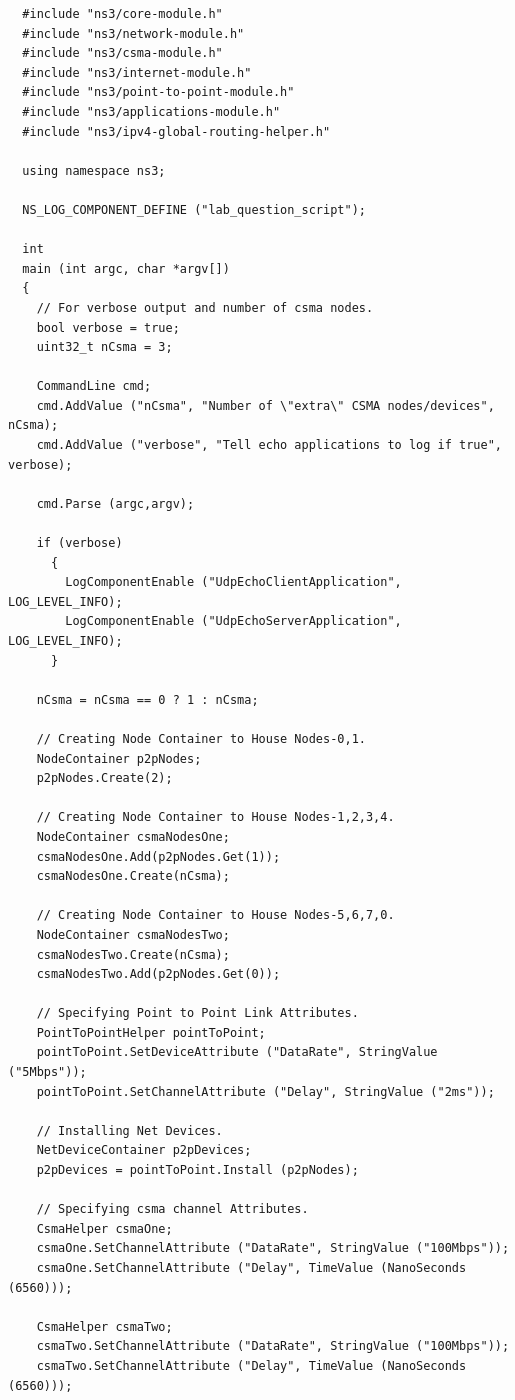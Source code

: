 \documentclass[fullpage]{article}
\begin{document}
\begin{verbatim}
  #include "ns3/core-module.h"
  #include "ns3/network-module.h"
  #include "ns3/csma-module.h"
  #include "ns3/internet-module.h"
  #include "ns3/point-to-point-module.h"
  #include "ns3/applications-module.h"
  #include "ns3/ipv4-global-routing-helper.h"

  using namespace ns3;

  NS_LOG_COMPONENT_DEFINE ("lab_question_script");

  int
  main (int argc, char *argv[])
  {
    // For verbose output and number of csma nodes.
    bool verbose = true;
    uint32_t nCsma = 3;

    CommandLine cmd;
    cmd.AddValue ("nCsma", "Number of \"extra\" CSMA nodes/devices", nCsma);
    cmd.AddValue ("verbose", "Tell echo applications to log if true", verbose);

    cmd.Parse (argc,argv);

    if (verbose)
      {
        LogComponentEnable ("UdpEchoClientApplication", LOG_LEVEL_INFO);
        LogComponentEnable ("UdpEchoServerApplication", LOG_LEVEL_INFO);
      }

    nCsma = nCsma == 0 ? 1 : nCsma;

    // Creating Node Container to House Nodes-0,1.
    NodeContainer p2pNodes;
    p2pNodes.Create(2);

    // Creating Node Container to House Nodes-1,2,3,4.
    NodeContainer csmaNodesOne;
    csmaNodesOne.Add(p2pNodes.Get(1));
    csmaNodesOne.Create(nCsma);

    // Creating Node Container to House Nodes-5,6,7,0.
    NodeContainer csmaNodesTwo;
    csmaNodesTwo.Create(nCsma);
    csmaNodesTwo.Add(p2pNodes.Get(0));

    // Specifying Point to Point Link Attributes.
    PointToPointHelper pointToPoint;
    pointToPoint.SetDeviceAttribute ("DataRate", StringValue ("5Mbps"));
    pointToPoint.SetChannelAttribute ("Delay", StringValue ("2ms"));

    // Installing Net Devices.
    NetDeviceContainer p2pDevices;
    p2pDevices = pointToPoint.Install (p2pNodes);

    // Specifying csma channel Attributes.
    CsmaHelper csmaOne;
    csmaOne.SetChannelAttribute ("DataRate", StringValue ("100Mbps"));
    csmaOne.SetChannelAttribute ("Delay", TimeValue (NanoSeconds (6560)));

    CsmaHelper csmaTwo;
    csmaTwo.SetChannelAttribute ("DataRate", StringValue ("100Mbps"));
    csmaTwo.SetChannelAttribute ("Delay", TimeValue (NanoSeconds (6560)));


\end{verbatim}
\end{document}
